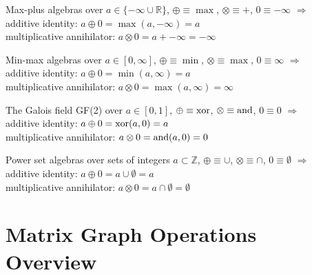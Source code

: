 Max-plus algebras over $a \in \{-\infty \cup \mathbb{R}\}$, $\oplus \equiv \max$, $\otimes \equiv +$, $0 \equiv -\infty$ $\Rightarrow$ \\
additive identity: $a \oplus 0  =  \max(a,-\infty) = a$ \\
multiplicative annihilator: $a \otimes 0 = a + -\infty = -\infty$

Min-max algebras over $a \in [0,\infty]$, $\oplus \equiv \min$, $\otimes \equiv \max$, $0 \equiv \infty$ $\Rightarrow$ \\
additive identity: $a \oplus 0  =  \min(a,\infty) = a$ \\
multiplicative annihilator: $a \otimes 0 = \max(a,\infty) = \infty$

The Galois field GF(2) over $a \in [0,1]$, $\oplus \equiv {\rm xor}$, $\otimes \equiv {\rm and}$, $0 \equiv 0$ $\Rightarrow$ \\
additive identity: $a \oplus 0  = {\rm xor}(a,0) = a$ \\
multiplicative annihilator: $a \otimes 0 = {\rm and}(a,0) = 0$

Power set algebras over sets of integers $a \subset \mathbb{Z}$, $\oplus \equiv \cup$, $\otimes \equiv \cap$, $0 \equiv \emptyset$ $\Rightarrow$ \\
additive identity: $a \oplus 0  =  a \cup \emptyset = a$ \\
multiplicative annihilator: $a \otimes 0 = a \cap \emptyset = \emptyset$


\section{Matrix Graph Operations Overview}

